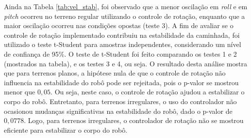 \documentclass[../main.tex]{subfiles}
\begin{document}
  Ainda na Tabela \ref{tab:vel_stab}, foi observado que a menor oscilação em \textit{roll} e em \textit{pitch} ocorreu no terreno regular utilizando o controle de rotação, enquanto que a maior oscilação ocorreu nas condições opostas (teste 3). A fim de avaliar se o controle de rotação implementado contribuiu na estabilidade da caminhada, foi utilizado o teste t-Student para amostras independentes, considerando um nível de confiança de 95\%. O teste de t-Student foi feito comparando os testes 1 e 2 (mostrados na tabela), e os testes 3 e 4, ou seja. O resultado desta análise mostra que para terrenos planos, a hipótese nula de que o controle de rotação não influencia na estabilidade do robô pode ser rejeitada, pois o p-valor se mostrou menor que $0,05$. Ou seja, neste caso, o controle de rotação ajudou a estabilizar o corpo do robô. Entretanto, para terrenos irregulares, o uso do controlador não ocasionou mudanças significativas na estabilidade do robô, dado o p-valor de $0,0778$. Logo, para terrenos irregulares, o controlador de rotação não se mostrou eficiente para estabilizar o corpo do robô. 
    



\end{document}
